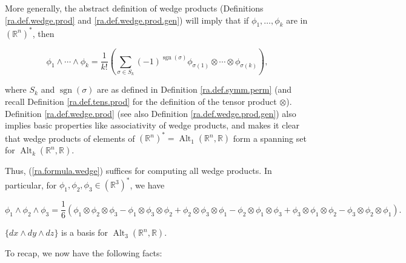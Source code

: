 More generally, the abstract definition of wedge products (Definitions \ref{ra.def.wedge.prod} and \ref{ra.def.wedge.prod.gen}) will imply that if \(\phi_1, \ldots, \phi_k\) are in \((\mathbb{R}^n)^*\), then

\begin{equation}\label{ra.formula.wedge}
\phi_1 \wedge \cdots \wedge \phi_k = \frac{1}{k!} \left( \sum_{\sigma \in S_k} (-1)^{\operatorname{sgn}(\sigma)} \phi_{\sigma(1)} \otimes \cdots \otimes \phi_{\sigma(k)} \right),
\end{equation}

where \(S_k\) and \(\operatorname{sgn}(\sigma)\) are as defined in Definition \ref{ra.def.symm.perm} (and recall Definition \ref{ra.def.tens.prod} for the definition of the tensor product \(\otimes\)). Definition \ref{ra.def.wedge.prod} (see also Definition \ref{ra.def.wedge.prod.gen}) also implies basic properties like associativity of wedge products, and makes it clear that wedge products of elements of \((\mathbb{R}^n)^* = \operatorname{Alt}_1(\mathbb{R}^n, \mathbb{R})\) form a spanning set for \( \operatorname{Alt}_k(\mathbb{R}^n, \mathbb{R})\). 

Thus, (\ref{ra.formula.wedge}) suffices for computing all wedge products. In particular, for \(\phi_1, \phi_2, \phi_3 \in (\mathbb{R}^3)^*\), we have

\begin{equation}\label{ra.formula.wedge.3}
\phi_1 \wedge \phi_2 \wedge \phi_3 = \frac{1}{6} \left( 
 \phi_1 \otimes \phi_2 \otimes \phi_3
- \phi_1 \otimes \phi_3 \otimes \phi_2 
+ \phi_2 \otimes \phi_3 \otimes \phi_1 
- \phi_2 \otimes \phi_1 \otimes \phi_3 
+ \phi_3 \otimes \phi_1 \otimes \phi_2 
- \phi_3 \otimes \phi_2 \otimes \phi_1 
\right).
\end{equation}

\begin{proposition}\label{ra.42b.hw14.prob.3}

\(\{dx \wedge dy \wedge dz\}\) is a basis for \( \operatorname{Alt}_3(\mathbb{R}^n, \mathbb{R})\).

\end{proposition}

To recap, we now have the following facts:

